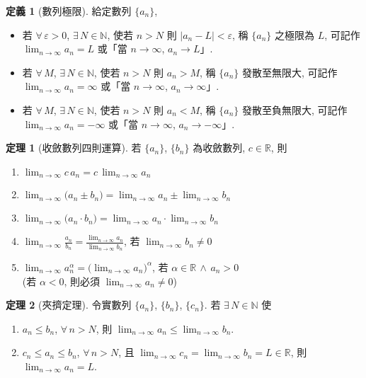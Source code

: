 \documentclass[12pt]{extarticle}
\newcommand{\ds}{\displaystyle}
\theoremstyle{definition}
\newtheorem*{dfn}{定義}
\newtheorem*{thm}{定理}
\begin{document}
\begin{dfn}[數列極限] 給定數列 $\{a_n\}$, 
  \begin{itemize}\setlength{\itemsep}{0pt}
    \item 若 $\forall\,\varepsilon > 0$, $\exists\,N\in\mathbb{N}$, 使若 $n > N$ 則 $|a_n - L| < \varepsilon$, 稱 $\{a_n\}$ 之極限為 $L$, 可記作 $\ds\lim_{n\to\infty} a_n = L$ 或「當 $n\to\infty$, $a_n\to L$」.  
    \item 若 $\forall\,M$, $\exists\,N\in\mathbb{N}$, 使若 $n > N$ 則 $a_n > M$, 稱 $\{a_n\}$ 發散至無限大, 可記作 $\ds\lim_{n\to\infty} a_n = \infty$ 或「當 $n\to\infty$, $a_n\to\infty$」.  
    \item 若 $\forall\,M$, $\exists\,N\in\mathbb{N}$, 使若 $n > N$ 則 $a_n < M$, 稱 $\{a_n\}$ 發散至負無限大, 可記作 $\ds\lim_{n\to\infty} a_n = -\infty$ 或「當 $n\to\infty$, $a_n\to-\infty$」.  
  \end{itemize}
\end{dfn}

\begin{thm}[收斂數列四則運算]   
  若 $\{a_n\}$, $\{b_n\}$ 為收斂數列, $c\in\mathbb{R}$, 則
  \setlength{\columnsep}{-30mm}
  \begin{multicols}{2}
    \begin{enumerate}\setlength\itemsep{0em}
      \item $\ds\lim_{n\to\infty}c\,a_n= c\,\lim_{n\to\infty}a_n$ 
      \item $\ds\lim_{n\to\infty}\big(a_n\pm b_n\big) = \lim_{n\to\infty}a_n\pm\lim_{n\to\infty}b_n$ 
      \item $\ds\lim_{n\to\infty}\big(a_n\cdot b_n\big) = \lim_{n\to\infty}a_n\cdot\lim_{n\to\infty}b_n$ 
      \item $\ds\lim_{n\to\infty}\frac{a_n}{b_n} = \frac{\lim_{n\to\infty}a_n}{\lim_{n\to\infty}b_n}$, 若 $\ds\lim_{n\to\infty}b_n\not=0$
      \item $\ds\lim_{n\to\infty}a_n^\alpha = \big(\lim_{n\to\infty}a_n\big)^\alpha$, 若 $\alpha\in\mathbb{R}\,\wedge\,a_n > 0$ \\(若 $\alpha < 0$, 則必須 $\ds\lim_{n\to\infty} a_n\ne 0$)
    \end{enumerate}
  \end{multicols}
\end{thm}

\begin{thm}[夾擠定理]
  令實數列 $\{a_n\}$, $\{b_n\}$, $\{c_n\}$. 若 $\exists\,N\in\mathbb{N}$ 使 
  \begin{enumerate}\setlength\itemsep{0em}
    \item $a_n\leqslant b_n$, $\forall\,n > N$, 則 $\ds\lim_{n\to\infty} a_n \leqslant\lim_{n\to\infty} b_n$. 
    \item $c_n\leqslant a_n\leqslant b_n$, $\forall\,n > N$, 且 $\ds\lim_{n\to\infty} c_n = \lim_{n\to\infty} b_n = L\in\mathbb{R}$, 則 $\ds\lim_{n\to\infty} a_n = L$. 
  \end{enumerate}
\end{thm}
\end{document}
